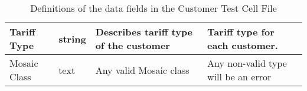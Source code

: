 \begin{table}
\begin{tabular}{|p{2cm}|p{1.5cm}|p{3cm}|p{6cm}|}
Tariff Type                      & string         & Describes tariff type of the customer                         & Tariff type for each customer.                                                                                                                                                                \\ \hline
Mosaic Class                     & text           & Any valid Mosaic class                                        & Any non-valid type will be an error                                                                                                                                                           \\ \hline
\end{tabular}
\caption{Definitions of the data fields in the Customer Test Cell File}
\label{tab:CustCellDef}
\end{table}

\

